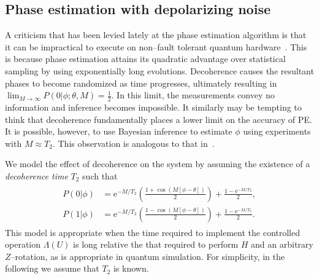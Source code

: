 \documentclass[aps,pra,amsmath,twocolumn,amssymb,superscriptaddress]{revtex4-1}
\newcommand{\ee}{\mathrm{e}}
\begin{document}
\subsection{Phase estimation with depolarizing noise}
A criticism that has been levied lately at the phase estimation algorithm is that it can be impractical to execute on non--fault tolerant quantum hardware~\cite{PMS+14,MBL+14}.  This is because phase estimation attains its quadratic advantage over statistical sampling by using exponentially long evolutions.  Decoherence causes the resultant phases to become randomized as time progresses, ultimately resulting in
$\lim_{M\rightarrow \infty} P(0|\phi;\theta,M) = \frac{1}{2}$.
In this limit, the measurements convey no information and inference becomes impossible.  It similarly may be tempting to think that decoherence fundamentally places a lower limit on the accuracy of PE.  It is possible, however, to use Bayesian inference to estimate $\phi$ using experiments with $M \approx T_2$.  This observation is analogous to that in~\cite{granade_robust_2012}.

We model the effect of decoherence on the system by assuming the existence of a \emph{decoherence time} $T_2$ such that
\begin{gather}
    \label{eq:likedecohere}
    \begin{aligned}
        P(0|\phi) & = \ee^{-M/T_2}\left(\frac{1+\cos(M[\phi -\theta])}{2}\right)+\frac{1-\ee^{-M/T_2}}{2},\\
        P(1|\phi) & = \ee^{-M/T_2}\left(\frac{1-\cos(M[\phi -\theta])}{2}\right)+\frac{1-\ee^{-M/T_2}}{2}.
    \end{aligned}
\end{gather}
This model is appropriate when the time required to implement the controlled operation $\Lambda(U)$ is long relative the that required to perform $H$ and an arbitrary $Z$--rotation, as is appropriate in quantum simulation.  For simplicity, in the following we assume that $T_2$ is known. 
\end{document}
